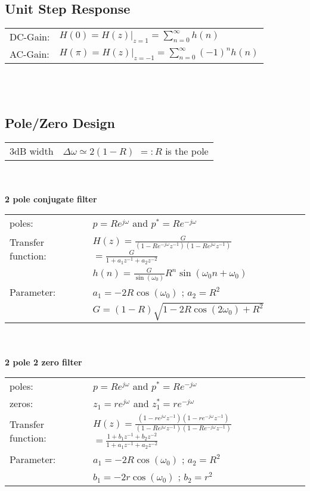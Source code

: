 \subsection{Unit Step Response}
\begin{tabularx}{1\textwidth}{l X}
	DC-Gain: & $H(0) = H(z)|_{z=1}= \sum\limits_{n=0}^{\infty}h(n) $
	\\
	AC-Gain: & $H(\pi) = H(z)|_{z=-1}= \sum\limits_{n=0}^{\infty}(-1)^n h(n) $
\end{tabularx}\\ \\


\subsection{Pole/Zero Design}
\begin{tabularx}{1\textwidth}{l X}
	3dB width & $\Delta\omega \simeq 2(1-R)$ \qquad $=:R$ is the pole
\end{tabularx}\\ \\

\textbf{2 pole conjugate filter}

\begin{tabularx}{1\textwidth}{l X}
	poles: & $ p = R e^{j\omega}$ \qquad and \qquad $ p^* = R e^{-j\omega}$
	\\ 
	Transfer function: & $H(z)= \frac{G}{(1-R e^{-j\omega}z^{-1})(1-Re^{j\omega}z^{-1})}$\
	$=\frac{G}{1+a_1z^{-1}+a_2z^{-2}}$
	\\
	& $h(n) = \frac{G}{\sin(\omega_0)}R^n \sin(\omega_0 n + \omega_0)$
	\\ 
	Parameter: & $a_1 = -2R\cos(\omega_0)$ \qquad; \qquad $a_2 = R^2$
	\\ 
	& $G = (1-R)\sqrt{1-2R\cos(2\omega_0)+ R^2}$
\end{tabularx}\\ \\

\textbf{2 pole 2 zero filter}

\begin{tabularx}{1\textwidth}{l X}
	poles: & $ p = R e^{j\omega}$ \qquad and \qquad $ p^* = R e^{-j\omega}$
	\\ 
	zeros: & $ z_1 = r e^{j\omega}$ \qquad and \qquad $ z_1^* = r e^{-j\omega}$
	\\
	Transfer function: & $H(z)= \frac{(1-r e^{j\omega}z^{-1})(1-re^{-j\omega}z^{-1})}{(1-R e^{j\omega}z^{-1})(1-Re^{-j\omega}z^{-1})}$\
	$=\frac{1+b_1z^{-1}+b_2z^{-2}}{1+a_1z^{-1}+a_2z^{-2}}$
	\\ 
	Parameter: & $a_1 = -2R\cos(\omega_0)$ \qquad; \qquad $a_2 = R^2$
	\\ 
	& $b_1 = -2r\cos(\omega_0)$ \qquad; \qquad $b_2 = r^2$
\end{tabularx}\\ \\

